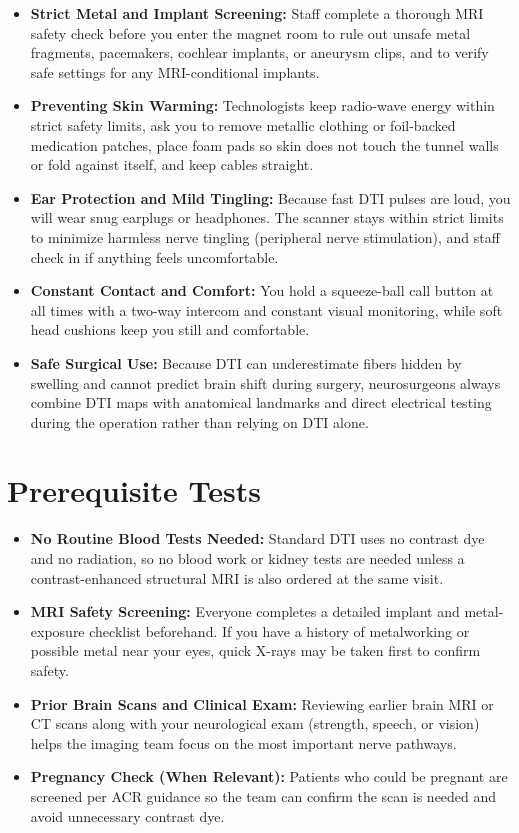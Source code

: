 \begin{itemize}
    \item \textbf{Strict Metal and Implant Screening:} Staff complete a thorough MRI safety check before you enter the magnet room to rule out unsafe metal fragments, pacemakers, cochlear implants, or aneurysm clips, and to verify safe settings for any MRI-conditional implants.
    \item \textbf{Preventing Skin Warming:} Technologists keep radio-wave energy within strict safety limits, ask you to remove metallic clothing or foil-backed medication patches, place foam pads so skin does not touch the tunnel walls or fold against itself, and keep cables straight.
    \item \textbf{Ear Protection and Mild Tingling:} Because fast DTI pulses are loud, you will wear snug earplugs or headphones. The scanner stays within strict limits to minimize harmless nerve tingling (peripheral nerve stimulation), and staff check in if anything feels uncomfortable.
    \item \textbf{Constant Contact and Comfort:} You hold a squeeze-ball call button at all times with a two-way intercom and constant visual monitoring, while soft head cushions keep you still and comfortable.
    \item \textbf{Safe Surgical Use:} Because DTI can underestimate fibers hidden by swelling and cannot predict brain shift during surgery, neurosurgeons always combine DTI maps with anatomical landmarks and direct electrical testing during the operation rather than relying on DTI alone.
\end{itemize}

\section{Prerequisite Tests}

\begin{itemize}
    \item \textbf{No Routine Blood Tests Needed:} Standard DTI uses no contrast dye and no radiation, so no blood work or kidney tests are needed unless a contrast-enhanced structural MRI is also ordered at the same visit.
    \item \textbf{MRI Safety Screening:} Everyone completes a detailed implant and metal-exposure checklist beforehand. If you have a history of metalworking or possible metal near your eyes, quick X-rays may be taken first to confirm safety.
    \item \textbf{Prior Brain Scans and Clinical Exam:} Reviewing earlier brain MRI or CT scans along with your neurological exam (strength, speech, or vision) helps the imaging team focus on the most important nerve pathways.
    \item \textbf{Pregnancy Check (When Relevant):} Patients who could be pregnant are screened per ACR guidance so the team can confirm the scan is needed and avoid unnecessary contrast dye.
\end{itemize}

